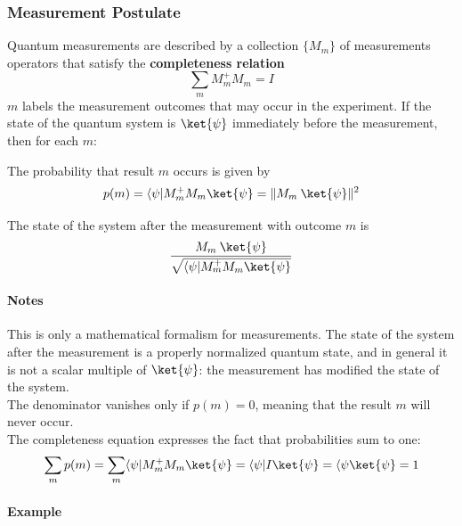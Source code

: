 \documentclass[10pt]{report}
\begin{document}
\subsubsection{Measurement Postulate}
Quantum measurements are described by a collection $\{M_m\}$ of measurements operators that satisfy the \textbf{completeness relation} $$\sum_m M_m^+ M_m = I$$
$m$ labels the measurement outcomes that may occur in the experiment. If the state of the quantum system is $\ket{\psi}$ immediately before the measurement, then for each $m$:
\begin{list}{}{}
	\item The probability that result $m$ occurs is given by $$p(m) = \langle\psi|M_m^+M_m\ket{\psi} = \|M_m\:\ket{\psi}\|^2$$
	\item The state of the system after the measurement with outcome $m$ is $$\frac{M_m\:\ket{\psi}}{\sqrt{\langle\psi|M_m^+M_m\ket{\psi}}}$$
\end{list}
\paragraph{Notes} This is only a mathematical formalism for measurements. The state of the system after the measurement is a properly normalized quantum state, and in general it is not a scalar multiple of $\ket{\psi}$: the measurement has modified the state of the system.\\
The denominator vanishes only if $p(m) = 0$, meaning that the result $m$ will never occur.\\
The completeness equation expresses the fact that probabilities sum to one: $$\sum_m p(m) = \sum_m \langle\psi|M_m^+M_m\ket{\psi} = \langle\psi|I\ket{\psi} = \langle\psi\ket{\psi} = 1$$
\paragraph{Example} %
\end{document}

